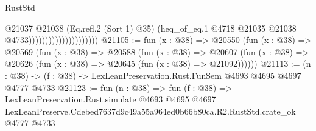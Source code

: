 \begin{lexlean}{RustStd}
\begin{coremodule}
                                          @21037
                                            @21038
                                            (Eq.refl.{2} (Sort 1) @35)
                                            (heq_of_eq.{1}
                                              @4718
                                              @21035
                                              @21038
                                              @4733)))))))))))))))))))))
@21105 := fun (x : @38) =>
  @20550
    (fun (x : @38) =>
    @20569
      (fun (x : @38) =>
      @20588
        (fun (x : @38) =>
        @20607 (fun (x : @38) => @20626 (fun (x : @38) => @20645 (fun (x : @38) => @21092))))))
@21113 := (n : @38) -> (f : @38) -> LexLeanPreservation.Rust.FunSem @4693 @4695 @4697 @4777 @4733
@21123 := fun (n : @38) =>
  fun (f : @38) =>
  LexLeanPreservation.Rust.simulate
    @4693
    @4695
    @4697
    LexLeanPreserve.Cdebed7637d9c49a55a964ed0b66b80ca.R2.RustStd.crate_ok
    @4777
    @4733
\end{coremodule}
\end{lexlean}
